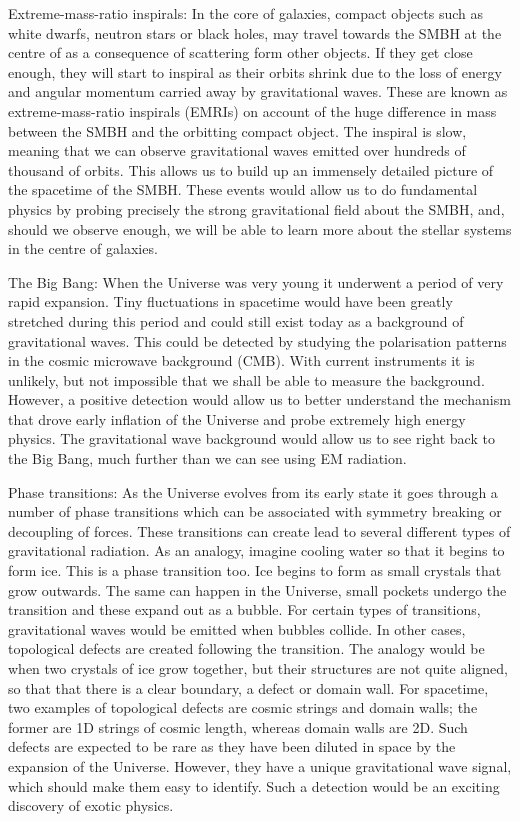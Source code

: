Extreme-mass-ratio inspirals: In the core of galaxies, compact objects such as white dwarfs, neutron stars or black holes, may travel towards the SMBH at the centre of as a consequence of scattering form other objects. If they get close enough, they will start to inspiral as their orbits shrink due to the loss of energy and angular momentum carried away by gravitational waves. These are known as extreme-mass-ratio inspirals (EMRIs) on account of the huge difference in mass between the SMBH and the orbitting compact object. The inspiral is slow, meaning that we can observe gravitational waves emitted over hundreds of thousand of orbits. This allows us to build up an immensely detailed picture of the spacetime of the SMBH. These events would allow us to do fundamental physics by probing precisely the strong gravitational field about the SMBH, and, should we observe enough, we will be able to learn more about the stellar systems in the centre of galaxies.

The Big Bang: When the Universe was very young it underwent a period of very rapid expansion. Tiny fluctuations in spacetime would have been greatly stretched during this period and could still exist today as a background of gravitational waves. This could be detected by studying the polarisation patterns in the cosmic microwave background (CMB). With current instruments it is unlikely, but not impossible that we shall be able to measure the background. However, a positive detection would allow us to better understand the mechanism that drove early inflation of the Universe and probe extremely high energy physics. The gravitational wave background would allow us to see right back to the Big Bang, much further than we can see using EM radiation.

Phase transitions: As the Universe evolves from its early state it goes through a number of phase transitions which can be associated with symmetry breaking or decoupling of forces. These transitions can create lead to several different types of gravitational radiation. As an analogy, imagine cooling water so that it begins to form ice. This is a phase transition too. Ice begins to form as small crystals that grow outwards. The same can happen in the Universe, small pockets undergo the transition and these expand out as a bubble. For certain types of transitions, gravitational waves would be emitted when bubbles collide. In other cases, topological defects are created following the transition. The analogy would be when two crystals of ice grow together, but their structures are not quite aligned, so that that there is a clear boundary, a defect or domain wall. For spacetime, two examples of topological defects are cosmic strings and domain walls; the former are 1D strings of cosmic length, whereas domain walls are 2D. Such defects are expected to be rare as they have been diluted in space by the expansion of the Universe. However, they have a unique gravitational wave signal, which should make them easy to identify. Such a detection would be an exciting discovery of exotic physics.

